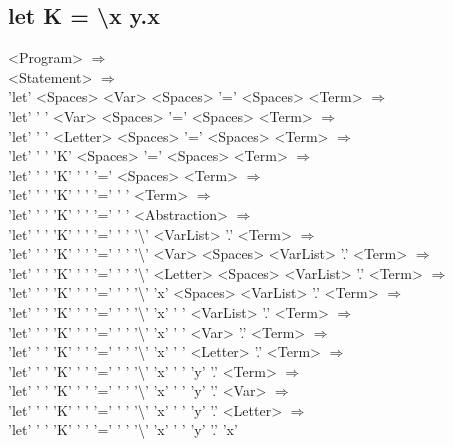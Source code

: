\documentclass{article}
\begin{document}
\subsection{let K = \textbackslash x y.x}
<Program> $\Rightarrow$ \\
<Statement> $\Rightarrow$ \\
'let' <Spaces> <Var> <Spaces> '=' <Spaces> <Term> $\Rightarrow$ \\
'let' ' ' <Var> <Spaces> '=' <Spaces> <Term> $\Rightarrow$ \\
'let' ' ' <Letter> <Spaces> '=' <Spaces> <Term> $\Rightarrow$ \\
'let' ' ' 'K' <Spaces> '=' <Spaces> <Term> $\Rightarrow$ \\
'let' ' ' 'K' ' ' '=' <Spaces> <Term> $\Rightarrow$ \\
'let' ' ' 'K' ' ' '=' ' ' <Term> $\Rightarrow$ \\
'let' ' ' 'K' ' ' '=' ' ' <Abstraction> $\Rightarrow$ \\
'let' ' ' 'K' ' ' '=' ' ' '\textbackslash' <VarList> '.' <Term> $\Rightarrow$ \\
'let' ' ' 'K' ' ' '=' ' ' '\textbackslash' <Var> <Spaces> <VarList> '.' <Term> $\Rightarrow$ \\
'let' ' ' 'K' ' ' '=' ' ' '\textbackslash' <Letter> <Spaces> <VarList> '.' <Term> $\Rightarrow$ \\
'let' ' ' 'K' ' ' '=' ' ' '\textbackslash' 'x' <Spaces> <VarList> '.' <Term> $\Rightarrow$ \\
'let' ' ' 'K' ' ' '=' ' ' '\textbackslash' 'x' ' ' <VarList> '.' <Term> $\Rightarrow$ \\
'let' ' ' 'K' ' ' '=' ' ' '\textbackslash' 'x' ' ' <Var> '.' <Term> $\Rightarrow$ \\
'let' ' ' 'K' ' ' '=' ' ' '\textbackslash' 'x' ' ' <Letter> '.' <Term> $\Rightarrow$ \\
'let' ' ' 'K' ' ' '=' ' ' '\textbackslash' 'x' ' ' 'y' '.' <Term> $\Rightarrow$ \\
'let' ' ' 'K' ' ' '=' ' ' '\textbackslash' 'x' ' ' 'y' '.' <Var> $\Rightarrow$ \\
'let' ' ' 'K' ' ' '=' ' ' '\textbackslash' 'x' ' ' 'y' '.' <Letter> $\Rightarrow$ \\
'let' ' ' 'K' ' ' '=' ' ' '\textbackslash' 'x' ' ' 'y' '.' 'x' \\
\end{document}
